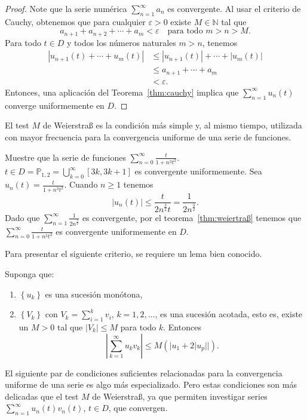 \begin{proof}
	Note que la serie numérica $\sum_{n=1}^{\infty}a_{n}$ es convergente. Al usar el criterio de Cauchy, obtenemos que para cualquier $\varepsilon>0$ existe $M\in\mathds{N}$ tal que \[ a_{n+1}+a_{n+2}+\cdots+a_{m}<\varepsilon\quad\text{para todo }m>n>M. \] Para todo $t\in D$ y todos los números naturales $m>n$, tenemos
	\begin{align*}
	\left|u_{n+1}\left(t\right)+\cdots+u_{m}\left(t\right)\right|
	&\leq\left|u_{n+1}\left(t\right)\right|+\cdots+\left|u_{m}\left(t\right)\right|\\
	&\leq a_{n+1}+\cdots+a_{m}\\
	&<\varepsilon.
	\end{align*}
Entonces, una aplicación del Teorema~\ref{thm:cauchy} implica que $\sum_{n=1}^{\infty}u_{n}\left(t\right)$ converge uniformemente en $D$.
\end{proof}
El test $M$ de Weierstraß es la condición más simple y, al mismo tiempo, utilizada con mayor frecuencia para la convergencia uniforme de una serie de funciones.
\begin{example}
	Muestre que la serie de funciones $\sum_{n=0}^{\infty}\frac{t}{1+n^{3}t^{2}}$. $t\in D=\mathds{P}_{1,2}=\bigcup_{k=0}^{\infty}\left[3k,3k+1\right]$ es convergente uniformemente. Sea $u_{n}\left(t\right)=\frac{t}{1+n^{3}t^{2}}$. Cuando $n\geq1$ tenemos \[ \left|u_{n}\left(t\right)\right|\leq\frac{t}{2n^{\frac{3}{2}}t}=\frac{1}{2n^{\frac{3}{2}}}. \] Dado que $\sum_{n=1}^{\infty}\frac{1}{2n^{\frac{3}{2}}}$ es convergente, por el teorema~\ref{thm:weiertraß} tenemos que $\sum_{n=0}^{\infty}\frac{t}{1+n^{3}t^{2}}$ es convergente uniformemente en $D$. 
\end{example}
Para presentar el siguiente criterio, se requiere un lema bien conocido.
\begin{lemma}
	Suponga que:
	\begin{enumerate}
		\item $\left\{u_{k}\right\}$ es una sucesión monótona,
		\item $\left\{V_{k}\right\}$ con $V_{k}=\sum_{i=1}^{k}v_{i}$, $k=1,2,\ldots$, es una sucesión acotada, esto es, existe un $M>0$ tal que $\left|V_{k}\right|\leq M$ para todo $k$. Entonces \[ \left|\sum_{k=1}^{\infty}u_{k}v_{k}\right|\leq M\left(|u_{1}+2|u_{p}||\right). \]
	\end{enumerate}
El siguiente par de condiciones suficientes relacionadas para la convergencia uniforme de una serie es algo más especializado. Pero estas condiciones son más delicadas que el test $M$ de Weierstraß, ya que permiten investigar series $\sum_{n=1}^{\infty}u_{n}\left(t\right)v_{n}\left(t\right)$, $t\in D$, que convergen.
\end{lemma}
